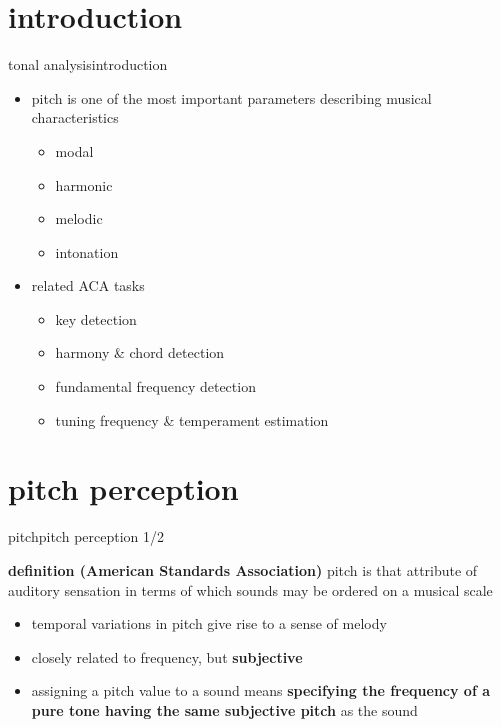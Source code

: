     \section[intro]{introduction}
        \begin{frame}{tonal analysis}{introduction}
            \begin{itemize}
                \item pitch is one of the most important parameters describing musical characteristics
                    \begin{itemize}
                        \item   modal
                        \item   harmonic
                        \item   melodic
                        \item   intonation
                    \end{itemize}
                \item<2-> related ACA tasks
                    \begin{itemize}
                        \item   key detection
                        \item   harmony \& chord detection
                        \item   fundamental frequency detection
                        \item   tuning frequency \& temperament estimation
                    \end{itemize}
            \end{itemize}
        \end{frame}

    \section[perception]{pitch perception}
         \begin{frame}{pitch}{pitch perception 1/2}
            \begin{block}{\textbf{definition (American Standards Association)}}
                pitch is that attribute of auditory sensation in terms of which sounds may be ordered on a musical scale
            \end{block}
            \bigskip    
            \begin{itemize}
                \item<2->   temporal variations in pitch give rise to a sense of melody
                \item<2->   closely related to frequency, but \textbf{subjective}

                \bigskip
                \item<3->[$\Rightarrow$]   assigning a pitch value to a sound means \textbf{specifying the frequency of a pure tone having the same subjective pitch} as the sound
            \end{itemize}
        \end{frame}
        
